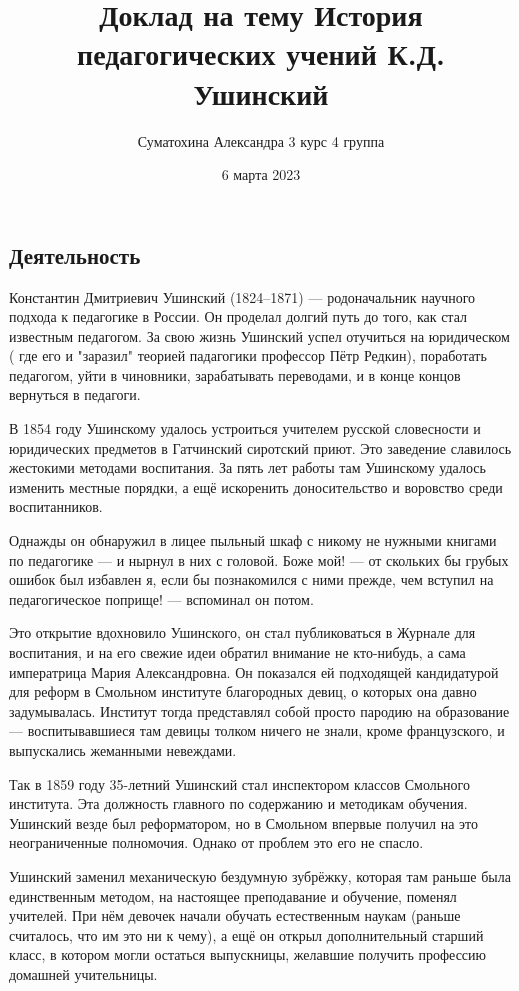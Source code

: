 
\usepackage{csquotes}

\title{Доклад на тему История педагогических учений К.Д. Ушинский}
\author{Суматохина Александра 3 курс 4 группа}
\date{6 марта 2023}

\maketitle

\subsection*  {Деятельность}
Константин Дмитриевич Ушинский (1824–1871) — родоначальник научного подхода к педагогике в России. Он проделал долгий путь до того, как стал известным педагогом. За свою жизнь Ушинский успел отучиться на юридическом ( где его и "заразил" теорией падагогики профессор Пётр Редкин), поработать педагогом, уйти в чиновники, зарабатывать переводами, и в конце концов вернуться в педагоги.

В 1854 году Ушинскому удалось устроиться учителем русской словесности и юридических предметов в Гатчинский сиротский приют. Это заведение славилось жестокими методами воспитания. За пять лет работы там Ушинскому удалось изменить местные порядки, а ещё искоренить доносительство и воровство среди воспитанников.

Однажды он обнаружил в лицее пыльный шкаф с никому не нужными книгами по педагогике — и нырнул в них с головой. Боже мой! — от скольких бы грубых ошибок был избавлен я, если бы познакомился с ними прежде, чем вступил на педагогическое поприще! — вспоминал он потом.

Это открытие вдохновило Ушинского, он стал публиковаться в Журнале для воспитания, и на его свежие идеи обратил внимание не кто-нибудь, а сама императрица Мария Александровна. Он показался ей подходящей кандидатурой для реформ в Смольном институте благородных девиц, о которых она давно задумывалась. Институт тогда представлял собой просто пародию на образование — воспитывавшиеся там девицы толком ничего не знали, кроме французского, и выпускались жеманными невеждами.

Так в 1859 году 35-летний Ушинский стал инспектором классов Смольного института. Эта должность главного по содержанию и методикам обучения. Ушинский везде был реформатором, но в Смольном впервые получил на это неограниченные полномочия. Однако от проблем это его не спасло.

Ушинский  заменил механическую бездумную зубрёжку, которая там раньше была единственным методом, на настоящее преподавание и обучение, поменял учителей. 
При нём девочек начали обучать естественным наукам (раньше считалось, что им это ни к чему), а ещё он открыл дополнительный старший класс, в котором могли остаться выпускницы, желавшие получить профессию домашней учительницы.

